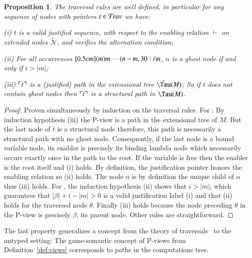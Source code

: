 \documentclass{elsarticle}
\def\shortproof{\begin{proof}}
\def\endshortproof{\end{proof}}
\theoremstyle{plain}
\newtheorem{proposition}[theorem]{Proposition}
\theoremstyle{definition}
\newcommand\Nodes{\mathcal{N}}%
\newcommand{\ghostvar}{\theta}
\newcommand\ExtendedNodes{\tilde{\Nodes}}
\newcommand{\enables}{\vdash} %
\newcommand{\ctree}{\Tau} %
\newcommand{\exttree}{\tilde{\Tau}} %
\newcommand{\ExternalNodes}{\Nodes^{\sf ext}}
\begin{document}
\begin{proposition}
\label{prop:ulctrav_welldefined_pathview}
The traversal rules are well defined, in particular for any sequence of nodes with pointers $t\in \mathcal{T}\!rav$ we have:
\begin{compactitem}
\item[(i)] $t$ is a valid justified sequence, with respect to
the enabling relation $\enables$ on extended nodes $\ExtendedNodes$, and verifies the alternation condition;
\item[(ii)] For all occurrences $\Pstr[0.5cm]{(m){m} \cdots (n-m,30:i){n}}$, $n$ is a ghost node if and only if $i > |m|$;
\item[(iii)] $\ulcorner t \urcorner$ is a (justified) path in the extensional tree $\exttree(M)$;
So if $t$ does not contain ghost nodes then $\ulcorner t \urcorner$ is a structural path in $\ctree(M)$.
\end{compactitem}
\end{proposition}
\shortproof
Proven simultaneously by induction on the traversal rules.
For : By induction hypothesis (iii) the P-view is a path in the extensional tree of $M$. But the last node of $t$ is a structural node therefore, this path is necessarily a structural path with no ghost node. Consequently, if the last node is a bound variable node, its enabler is precisely its binding lambda node which necessarily occurs exactly once in the path to the root. If the variable is free then the enabler is the root itself and (i) holds. By definition, the justification pointer honors the enabling relation so (ii) holds. The node $n$ is by definition the unique child of $\alpha$ thus (iii) holds.
%
For \rulenamet{Lam^\ghostvar}, the induction hypothesis (ii) shows that $i>|m|$, which guarantees that $|\beta|+i-|m|>0$ is a valid justification label (i) and that (ii) holds for the traversed node $\ghostvar$.
Finally (iii) holds because the node preceding $\ghostvar$ in the P-view is precisely $\beta$, its parent node.
%
Other rules are straightforward.
\endshortproof

The last property generalizes a concept from the theory of traversals~\cite{OngLics2006,BlumPhd} to the untyped setting: The game-semantic concept of P-views from Definition~\ref{def:views} corresponds to paths in the computations tree.
\end{document}
